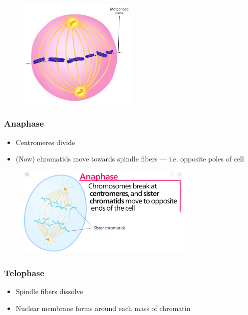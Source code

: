 \documentclass[a4paper,12pt]{article}
\begin{document}
\begin{figure}[H]
    \centering
    \includegraphics[width=0.5\textwidth]{metaphase}
\end{figure}

\pagebreak

\subsubsection{Anaphase}
\begin{itemize}
    \item{Centromeres divide}
    \item{(Now) chromatids move towards spindle fibers --- i.e. opposite poles of cell}
\end{itemize}

\begin{figure}[H]
    \centering
    \includegraphics[width=0.75\textwidth]{anaphase}
\end{figure}

\subsubsection{Telophase}
\begin{itemize}
    \item{Spindle fibers dissolve}
    \item{Nuclear membrane forms around each mass of chromatin}
\end{itemize}
\end{document}
